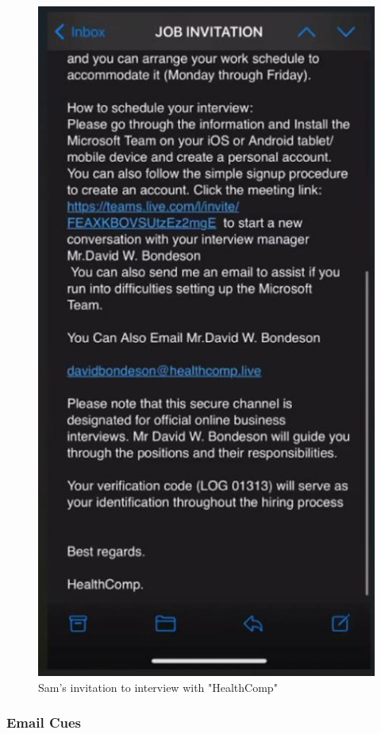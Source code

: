 \begin{fullwidth}
\begin{figure}[H]
    \includegraphics[scale=.5]{assets/full-interview-email-2.png}
    \captionsetup{justification=centering}
    \caption{Sam's invitation to interview with "HealthComp"}
\end{figure}

\subsubsection{Email Cues} %


\end{fullwidth}
